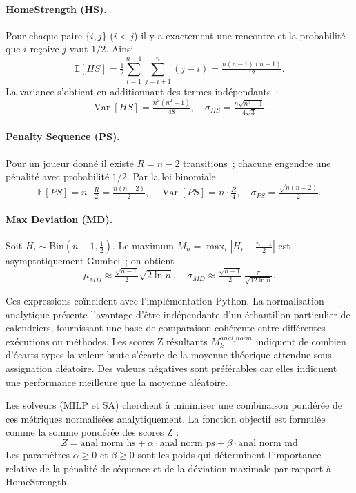 \documentclass[11pt, a4paper]{article}
\begin{document}
\paragraph{HomeStrength (HS).}
Pour chaque paire $\{i,j\}$ ($i<j$) il y a exactement une rencontre et la probabilité que $i$ reçoive $j$ vaut $1/2$.
Ainsi
\[
\mathbb{E}[HS]=\tfrac12 \sum_{i=1}^{n-1}\sum_{j=i+1}^{n}(j-i)
      =\tfrac{n(n-1)(n+1)}{12}.
\]
La variance s’obtient en additionnant des termes indépendants :
\[
\operatorname{Var}[HS]=\tfrac{n^{2}(n^{2}-1)}{48},\quad
\sigma_{HS}= \tfrac{n\sqrt{n^{2}-1}}{4\sqrt{3}}.
\]

\paragraph{Penalty Sequence (PS).}
Pour un joueur donné il existe $R=n-2$ transitions ; chacune engendre une pénalité avec probabilité $1/2$.
Par la loi binomiale
\[
\mathbb{E}[PS]=n\cdot\tfrac{R}{2}= \tfrac{n(n-2)}{2},\quad
\operatorname{Var}[PS]=n\cdot\tfrac{R}{4},\quad
\sigma_{PS}= \tfrac{\sqrt{n(n-2)}}{2}.
\]

\paragraph{Max Deviation (MD).}
Soit $H_i\sim\mathrm{Bin}(n-1,\tfrac12)$.
Le maximum \(M_n = \max_i |H_i-\tfrac{n-1}{2}|\) est asymptotiquement Gumbel ; on obtient
\[
\mu_{MD}\approx\tfrac{\sqrt{n-1}}{2}\sqrt{2\ln n},\quad
\sigma_{MD}\approx\tfrac{\sqrt{n-1}}{2}\,\tfrac{\pi}{\sqrt{12\ln n}}.
\]

Ces expressions coïncident avec l’implémentation Python.
La normalisation analytique présente l'avantage d'être indépendante d'un échantillon particulier de calendriers, fournissant une base de comparaison cohérente entre différentes exécutions ou méthodes. Les scores Z résultants $M_k^{anal\_norm}$ indiquent de combien d'écarts-types la valeur brute s'écarte de la moyenne théorique attendue sous assignation aléatoire. Des valeurs négatives sont préférables car elles indiquent une performance meilleure que la moyenne aléatoire.

Les solveurs (MILP et SA) cherchent à minimiser une combinaison pondérée de ces métriques normalisées analytiquement. La fonction objectif est formulée comme la somme pondérée des scores Z :
\begin{equation}
    Z = \mathrm{anal\_norm\_hs} + \alpha \cdot \mathrm{anal\_norm\_ps} + \beta \cdot \mathrm{anal\_norm\_md}
    \label{eq:objectif_analytique}
\end{equation}
Les paramètres $\alpha \geq 0$ et $\beta \geq 0$ sont les poids qui déterminent l'importance relative de la pénalité de séquence et de la déviation maximale par rapport à HomeStrength.
\end{document}
